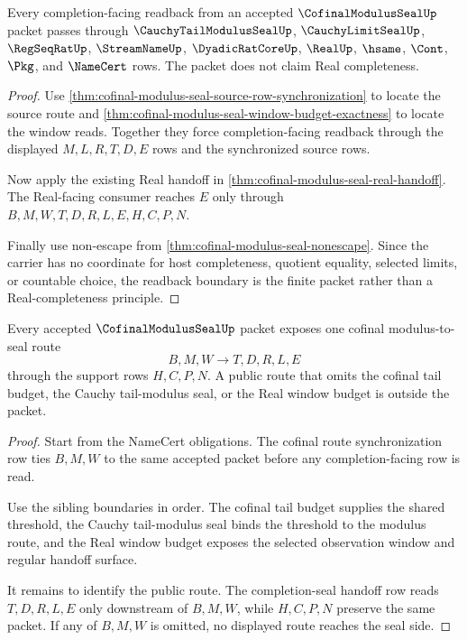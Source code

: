 \begin{theorem}
\label{thm:cofinal-modulus-seal-completion-readback-boundary}
Every completion-facing readback from an accepted $\CofinalModulusSealUp$ packet passes through $\CauchyTailModulusSealUp$, $\CauchyLimitSealUp$, $\RegSeqRatUp$, $\StreamNameUp$, $\DyadicRatCoreUp$, $\RealUp$, $\hsame$, $\Cont$, $\Pkg$, and $\NameCert$ rows. The packet does not claim Real completeness.
\end{theorem}
\begin{proof}
Use \autoref{thm:cofinal-modulus-seal-source-row-synchronization} to locate the source route and \autoref{thm:cofinal-modulus-seal-window-budget-exactness} to locate the window reads. Together they force completion-facing readback through the displayed $M,L,R,T,D,E$ rows and the synchronized source rows.

Now apply the existing Real handoff in \autoref{thm:cofinal-modulus-seal-real-handoff}. The Real-facing consumer reaches $E$ only through $B,M,W,T,D,R,L,E,H,C,P,N$.

Finally use non-escape from \autoref{thm:cofinal-modulus-seal-nonescape}. Since the carrier has no coordinate for host completeness, quotient equality, selected limits, or countable choice, the readback boundary is the finite packet rather than a Real-completeness principle.
\end{proof}

\begin{theorem}
\label{thm:cofinal-modulus-seal-cofinal-route}
Every accepted $\CofinalModulusSealUp$ packet exposes one cofinal modulus-to-seal route
$$
B,M,W \to T,D,R,L,E
$$
through the support rows $H,C,P,N$. A public route that omits the cofinal tail budget, the Cauchy tail-modulus seal, or the Real window budget is outside the packet.
\end{theorem}
\begin{proof}
Start from the NameCert obligations. The cofinal route synchronization row ties $B,M,W$ to the same accepted packet before any completion-facing row is read.

Use the sibling boundaries in order. The cofinal tail budget supplies the shared threshold, the Cauchy tail-modulus seal binds the threshold to the modulus route, and the Real window budget exposes the selected observation window and regular handoff surface.

It remains to identify the public route. The completion-seal handoff row reads $T,D,R,L,E$ only downstream of $B,M,W$, while $H,C,P,N$ preserve the same packet. If any of $B,M,W$ is omitted, no displayed route reaches the seal side.
\end{proof}


